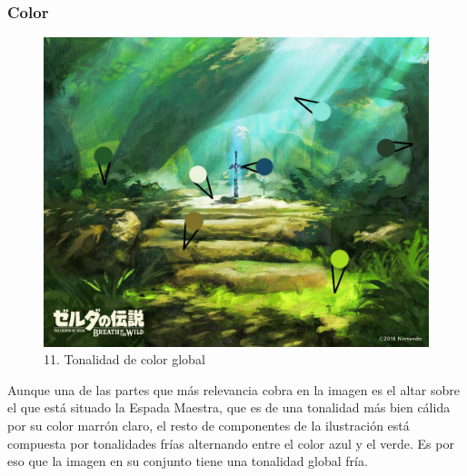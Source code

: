 \documentclass[12pt]{article}
\begin{document}
    \subsubsection{Color}
        \begin{figure}[H]
      \centering
      \includegraphics[width=\textwidth]{images/Carlos/12/Tonalidad.jpg}
      \caption{\small 11. Tonalidad de color global}
    \end{figure}
    Aunque una de las partes que más relevancia cobra en la imagen es el altar sobre el que está situado la Espada Maestra, que es de una tonalidad más bien cálida por su color marrón claro, el resto de componentes de la ilustración está compuesta por tonalidades frías alternando entre el color azul y el verde. Es por eso que la imagen en su conjunto tiene una tonalidad global fría.
\end{document}
